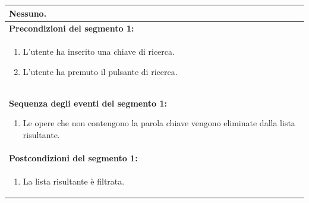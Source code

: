 \documentclass{article}
\begin{document}
\begin{table}[t]
\begin{tabular}{|p{\linewidth}|}
                        Nessuno. \\
                        \hline
                        \cellcolor{gray!20}
                        \textbf{Precondizioni del segmento 1:} \\
                        \cellcolor{gray!20}
                        \begin{minipage}{\linewidth}
                            \begin{enumerate}[noitemsep]
                                \item L'utente ha inserito una chiave di ricerca.
                                \item L'utente ha premuto il pulsante di ricerca.
                            \end{enumerate}
                        \end{minipage} \\
                        \hline
                        \textbf{Sequenza degli eventi del segmento 1:}
                        \begin{enumerate}
                            \item Le opere che non contengono la parola chiave vengono eliminate dalla lista risultante.
                        \end{enumerate} \\
                        \hline
                        \cellcolor{gray!20}
                        \textbf{Postcondizioni del segmento 1:} \\
                        \cellcolor{gray!20}
                        \begin{minipage}{\linewidth}
                            \begin{enumerate}[noitemsep]
                                \item La lista risultante è filtrata.
                            \end{enumerate}
                        \end{minipage} \\
                        \hline
                    \end{tabular}
                \end{table}
\end{document}
